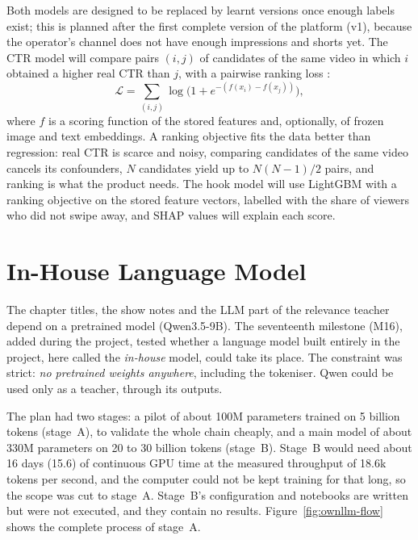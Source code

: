 Both models are designed to be replaced by learnt versions once enough labels exist; this is planned after the first complete version of the platform (v1), because the operator's channel does not have enough impressions and shorts yet. The CTR model will compare pairs $(i,j)$ of candidates of the same video in which $i$ obtained a higher real CTR than $j$, with a pairwise ranking loss \cite{burges2005ranknet}:
\begin{equation}
\mathcal{L} = \sum_{(i,j)} \log\!\Big(1 + e^{-\left(f(x_i) - f(x_j)\right)}\Big),
\label{eq:ranknet}
\end{equation}
where $f$ is a scoring function of the stored features and, optionally, of frozen image and text embeddings. A ranking objective fits the data better than regression: real CTR is scarce and noisy, comparing candidates of the same video cancels its confounders, $N$ candidates yield up to $N(N-1)/2$ pairs, and ranking is what the product needs. The hook model will use LightGBM \cite{ke2017lightgbm} with a ranking objective on the stored feature vectors, labelled with the share of viewers who did not swipe away, and SHAP values \cite{lundberg2017shap} will explain each score.

\section{In-House Language Model}
\label{s:ownllm}

The chapter titles, the show notes and the LLM part of the relevance teacher depend on a pretrained model (Qwen3.5-9B). The seventeenth milestone (M16), added during the project, tested whether a language model built entirely in the project, here called the \textit{in-house} model, could take its place. The constraint was strict: \textit{no pretrained weights anywhere}, including the tokeniser. Qwen could be used only as a teacher, through its outputs.

The plan had two stages: a pilot of about 100M parameters trained on 5 billion tokens (stage~A), to validate the whole chain cheaply, and a main model of about 330M parameters on 20 to 30 billion tokens (stage~B). Stage~B would need about 16 days (15.6) of continuous GPU time at the measured throughput of 18.6k tokens per second, and the computer could not be kept training for that long, so the scope was cut to stage~A. Stage~B's configuration and notebooks are written but were not executed, and they contain no results. Figure~\ref{fig:ownllm-flow} shows the complete process of stage~A.

